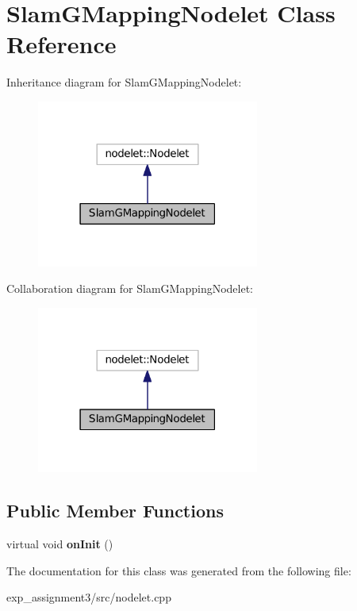 \hypertarget{classSlamGMappingNodelet}{}\section{Slam\+G\+Mapping\+Nodelet Class Reference}
\label{classSlamGMappingNodelet}


Inheritance diagram for Slam\+G\+Mapping\+Nodelet\+:\nopagebreak
\begin{figure}[H]
\begin{center}
\leavevmode
\includegraphics[width=207pt]{classSlamGMappingNodelet__inherit__graph}
\end{center}
\end{figure}


Collaboration diagram for Slam\+G\+Mapping\+Nodelet\+:\nopagebreak
\begin{figure}[H]
\begin{center}
\leavevmode
\includegraphics[width=207pt]{classSlamGMappingNodelet__coll__graph}
\end{center}
\end{figure}
\subsection*{Public Member Functions}
\begin{DoxyCompactItemize}
\item 
virtual void {\bfseries on\+Init} ()\hypertarget{classSlamGMappingNodelet_afeec962f825e389b6a52cd7f9debf425}{}\label{classSlamGMappingNodelet_afeec962f825e389b6a52cd7f9debf425}

\end{DoxyCompactItemize}


The documentation for this class was generated from the following file\+:\begin{DoxyCompactItemize}
\item 
exp\+\_\+assignment3/src/nodelet.\+cpp\end{DoxyCompactItemize}
